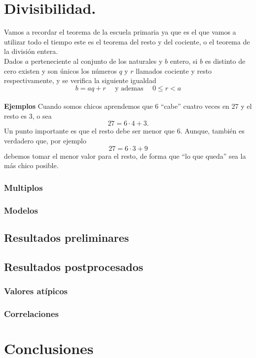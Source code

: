 \documentclass[12pt]{book}
\begin{document}
\chapter{Divisibilidad.}
Vamos a recordar el teorema de la escuela primaria ya que es el que vamos a utilizar todo el tiempo este es el teorema del resto y del cociente, o el teorema de la división entera. \\
Dados $a$ perteneciente al conjunto de los naturales y $b$ entero,  si $b$ es distinto de cero existen y son únicos los números $q$ y $r$ llamados cociente y resto respectivamente, y se verifica la siguiente igualdad
\[ b = aq + r  \quad \text{ y ademas } \quad 0 \leq r < a \] \\
\textbf{Ejemplos}
Cuando somos chicos aprendemos que 6 “cabe” cuatro veces en 27 y el resto es 3, o sea
\[ 27 = 6 \cdot 4 + 3. \]
Un punto importante es que el resto debe ser menor que 6. Aunque, también es verdadero que,
por ejemplo
\[27 = 6 \cdot 3 + 9\]
debemos tomar el menor valor para el resto, de forma que “lo que queda” sea la más chico posible.

\subsection{Multiplos}

\subsection{Modelos}
\section{Resultados preliminares}
\section{Resultados postprocesados}
\subsection{Valores atípicos}
\subsection{Correlaciones}
\chapter{Conclusiones}
\end{document}
